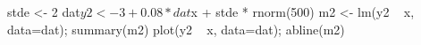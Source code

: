 \begin{Schunk}
\begin{Sinput}
 stde <- 2
 dat$y2 <- 3 + 0.08 * dat$x + stde * rnorm(500)
 m2 <- lm(y2 ~ x, data=dat); summary(m2)
 plot(y2 ~ x, data=dat); abline(m2)
\end{Sinput}
\end{Schunk}
